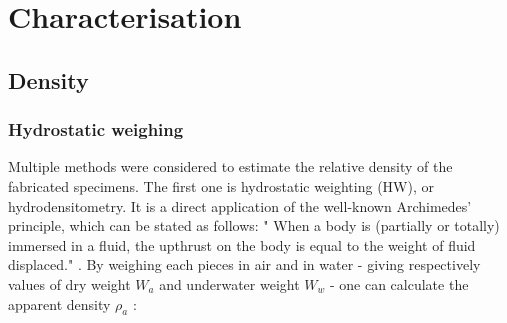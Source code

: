 \begin{center}
\begin{table}[ht]
\noindent{} 

\caption[List of the cubic heat-treated specimens]{List of the cubic heat-treated specimens}
\label{tab:RTT}
\end{table}
\end{center}


\section{Characterisation}

\subsection{Density}

\subsubsection{Hydrostatic weighing}

Multiple methods were considered to estimate the relative density of the fabricated specimens. The first one is hydrostatic weighting (HW), or hydrodensitometry. It is a direct application of the well-known Archimedes' principle, which can be stated as follows: " When a body is (partially or totally) immersed in a fluid, the upthrust on the body is equal to the weight of fluid displaced." \parencite{ADictionaryofPhysics}. By weighing each pieces in air and in water - giving respectively values of dry weight $W_a$ and underwater weight $W_w$ - one can calculate the apparent density $\rho_a$ \parencite{MethArch}:


